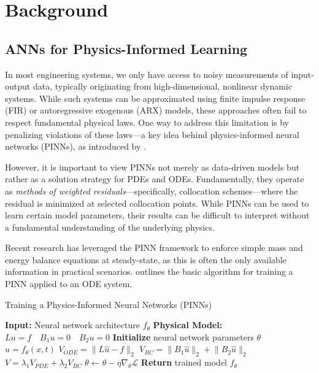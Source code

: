\documentclass[fontsize=11pt]{article}
\newcommand{\norm}[1]{\lVert #1 \rVert}
\theoremstyle{definition}
\begin{document}
\section{Background}

\subsection{ANNs for Physics-Informed Learning}

In most engineering systems, we only have access to noisy measurements of 
input-output data, typically originating from high-dimensional, nonlinear dynamic 
systems. While such systems can be approximated using finite impulse response (FIR) 
or autoregressive exogenous (ARX) models, these approaches often fail to respect 
fundamental physical laws. One way to address this limitation is by penalizing 
violations of these laws—a key idea behind physics-informed neural networks (PINNs), 
as introduced by \cite{raissi:perdikaris:karniadakis:2019}.

However, it is important to view PINNs not merely as data-driven models but 
rather as a solution strategy for PDEs and ODEs. Fundamentally, they operate 
as \textit{methods of weighted residuals}—specifically, collocation schemes—where 
the residual is minimized at selected collocation points. While PINNs can be 
used to learn certain model parameters, their results can be difficult to interpret 
without a fundamental understanding of the underlying physics.

Recent research has leveraged the PINN framework to enforce simple mass and energy 
balance equations at steady-state, as this is often the only available information 
in practical scenarios.  outlines the basic algorithm for training 
a PINN applied to an ODE system.

\begin{algorithm}[h]
\caption{Training a Physics-Informed Neural Networks (PINNs)}
\label{alg:PINNs}
\begin{algorithmic}[1]
\State \textbf{Input:} Neural network architecture $f_{\theta}$
\State \textbf{Physical Model:} $Lu=f \quad B_1 u = 0 \quad B_2 u = 0$
\State \textbf{Initialize} neural network parameters $\theta$
\Repeat
    \State $\hat{u} = f_{\theta}(x,t)$
    \State $V_{ODE} = \norm{L\hat{u} - f}_{2}$ 
    \State $V_{BC} = \norm{B_1 \hat{u}}_{2} + \norm{B_2 \hat{u}}_{2}$
    \State $V = \lambda_1 V_{PDE}  + \lambda_2 V_{BC}$
    \State $\theta \leftarrow \theta - \eta \nabla_{\theta} \mathcal{L}$
\State \textbf{Return} trained model $f_{\theta}$
\end{algorithmic}
\end{algorithm}
    
\end{document}
